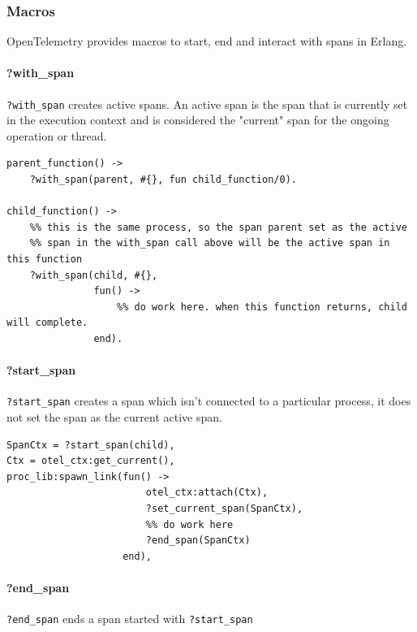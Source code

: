     \subsubsection{Macros}
        OpenTelemetry provides macros to start, end and interact with spans in Erlang. \cite{otel-in}
        \paragraph{?with\_span}
            \texttt{?with\_span} creates active spans. An active span is the span that is currently set in the execution context and is considered the "current" span for the ongoing operation or thread. \cite{active-s}
        \begin{verbatim}
parent_function() ->
    ?with_span(parent, #{}, fun child_function/0).

child_function() ->
    %% this is the same process, so the span parent set as the active
    %% span in the with_span call above will be the active span in this function
    ?with_span(child, #{},
               fun() ->
                   %% do work here. when this function returns, child will complete.
               end).
        \end{verbatim}
        \paragraph{?start\_span}
            \texttt{?start\_span} creates a span which isn't connected to a particular process, it does not set the span as the current active span.
        \begin{verbatim}
SpanCtx = ?start_span(child),
Ctx = otel_ctx:get_current(),
proc_lib:spawn_link(fun() ->
                        otel_ctx:attach(Ctx),
                        ?set_current_span(SpanCtx),
                        %% do work here
                        ?end_span(SpanCtx)
                    end),
        \end{verbatim}


        \paragraph{?end\_span}
            \texttt{?end\_span} ends a span started with \texttt{?start\_span}

